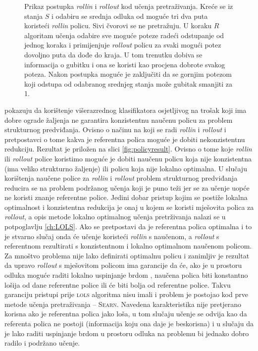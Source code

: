 \begin{figure}
\caption[Prikaz postupka \textit{rollin} i \textit{rollout} kod učenja
pretraživanja.]{Prikaz postupka \textit{rollin} i \textit{rollout} kod učenja
pretraživanja. Kreće se iz stanja $S$ i odabiru se srednja odluka od moguće tri
dva puta koristeći \textit{rollin} policu. Sivi čvorovi se ne pretražuju. U
koraku $R$ algoritam učenja odabire sve moguće poteze radeći odstupanje od
jednog koraka i primijenjuje \textit{rollout} policu za svaki mogući potez
dovoljno puta da dođe do kraja. U tom trenutku dobiva se informacija o gubitku i
ona se koristi kao procjena dobrote svakog poteza. Nakon postupka moguće je
zaključiti da se gornjim potezom koji odstupa od odabranog srednjeg stanja može
gubitak smanjiti za 1.} \label{fig:rollinout}
\end{figure}

\cite{daume15lols} pokazuju da korištenje višerazrednog klasifikatora
osjetljivog na trošak koji ima dobre ograde žaljenja ne garantira konzistentnu
naučenu policu za problem strukturnog predviđanja. Ovisno o načinu na koji se
radi \textit{rollin} i \textit{rollout} i pretpostavci o tome kakva je
referentna polica moguće je dobiti nekonzistentnu redukciju. Rezultat je
priložen na slici \ref{fig:policyresult}. Ovisno o tome koje \textit{rollin} ili
\textit{rollout} police koristimo moguće je dobiti naučenu policu koja nije
konzistentna (ima veliko strukturno žaljenje) ili policu koja nije lokalno
optimalna. U slučaju korištenja naučene police za \textit{rollin} i
\textit{rollout} problem strukturnog predviđanja reducira se na problem
podržanog učenja koji je puno teži jer se za učenje uopće ne koristi znanje
referentne police. Jedini dobar pristup kojim se postiže lokalna optimalnost i
konzistentna redukcija je onaj u kojem se koristi mješovita polica za
\textit{rollout}, a opis metode lokalno optimalnog učenja pretrživanja nalazi se
u potpoglavlju \ref{ch:LOLS}. Ako se pretpostavi da je referentna polica
optimalna i to je stvarno slučaj onda će učenje koristeći \textit{rollin} s
naučenom, a \textit{rollout} s  referentnom rezultirati s konzistentnom i
lokalno optimalnom naučenom policom. Za mnoštvo problema nije lako definirati
optimalnu policu i zanimljiv je rezultat da upravo \textit{rollout} s mješovitom
policom ima garancije da će, ako je u prostoru odluka moguće raditi lokalno
uspinjanje brdom , naučena polica biti konstantno
lošija od dane referentne police ili će biti bolja od referentne police. Takvu
garanciju pristupi prije \textsc{lols} algoritma nisu imali i problem je
postojao kod prve metode učenja pretraživanja -- \textsc{Searn}. Navedena
karakteristika nije pretjerano korisna ako je referentna polica jako loša, u tom
slučaju učenje se odvija kao da referenta polica ne postoji (informacija koju
ona daje je beskorisna) i u slučaju da je lako raditi uspinjanje brdom u
prostoru odluka na problemu bi jednako dobro radilo i podržano učenje.

